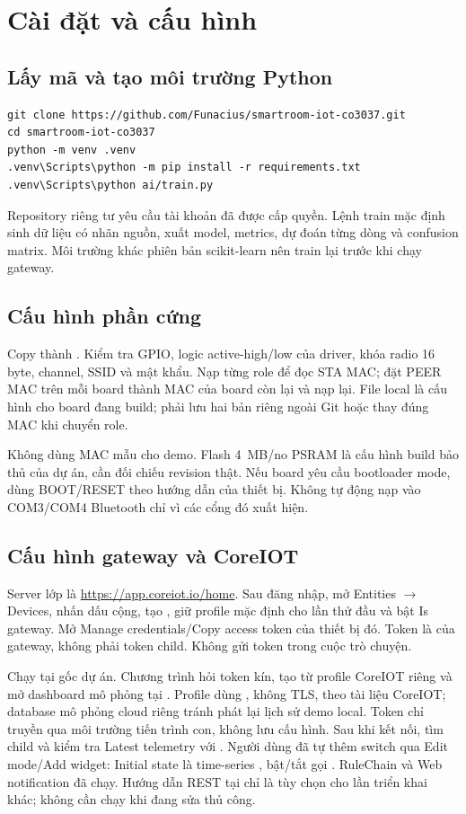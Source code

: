 \section{Cài đặt và cấu hình}
\subsection{Lấy mã và tạo môi trường Python}
\begin{verbatim}
git clone https://github.com/Funacius/smartroom-iot-co3037.git
cd smartroom-iot-co3037
python -m venv .venv
.venv\Scripts\python -m pip install -r requirements.txt
.venv\Scripts\python ai/train.py
\end{verbatim}
Repository riêng tư yêu cầu tài khoản đã được cấp quyền. Lệnh train mặc định sinh dữ liệu có nhãn nguồn, xuất model, metrics, dự đoán từng dòng và confusion matrix. Môi trường khác phiên bản scikit-learn nên train lại trước khi chạy gateway.

\subsection{Cấu hình phần cứng}
Copy  thành . Kiểm tra GPIO, logic active-high/low của driver, khóa radio 16 byte, channel, SSID và mật khẩu. Nạp từng role để đọc STA MAC; đặt PEER MAC trên mỗi board thành MAC của board còn lại và nạp lại. File local là cấu hình cho board đang build; phải lưu hai bản riêng ngoài Git hoặc thay đúng MAC khi chuyển role.

Không dùng MAC mẫu cho demo. Flash 4~MB/no PSRAM là cấu hình build bảo thủ của dự án, cần đối chiếu revision thật. Nếu board yêu cầu bootloader mode, dùng BOOT/RESET theo hướng dẫn của thiết bị. Không tự động nạp vào COM3/COM4 Bluetooth chỉ vì các cổng đó xuất hiện.

\subsection{Cấu hình gateway và CoreIOT}
Server lớp là \url{https://app.coreiot.io/home}. Sau đăng nhập, mở Entities $\rightarrow$ Devices, nhấn dấu cộng, tạo , giữ profile mặc định cho lần thử đầu và bật Is gateway. Mở Manage credentials/Copy access token của thiết bị đó. Token là của gateway, không phải token child. Không gửi token trong cuộc trò chuyện.

Chạy  tại gốc dự án. Chương trình hỏi token kín, tạo  từ profile CoreIOT riêng và mở dashboard mô phỏng tại . Profile dùng , không TLS, theo tài liệu CoreIOT; database mô phỏng cloud riêng tránh phát lại lịch sử demo local. Token chỉ truyền qua môi trường tiến trình con, không lưu cấu hình. Sau khi kết nối, tìm child  và kiểm tra Latest telemetry với . Người dùng đã tự thêm switch qua Edit mode/Add widget: Initial state là time-series , bật/tắt gọi . RuleChain và Web notification đã chạy. Hướng dẫn REST tại  chỉ là tùy chọn cho lần triển khai khác; không cần chạy khi đang sửa thủ công.

